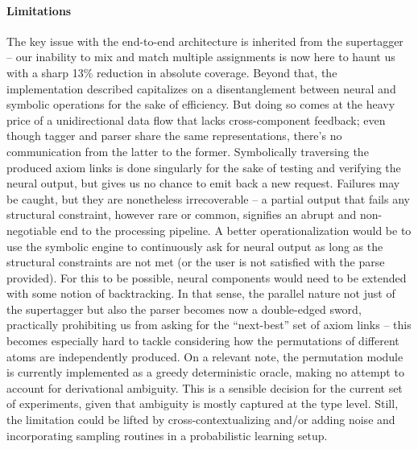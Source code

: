 \paragraph{Limitations}
The key issue with the end-to-end architecture is inherited from the supertagger -- our inability to mix and match multiple assignments is now here to haunt us with a sharp 13\% reduction in absolute coverage.
Beyond that, the implementation described capitalizes on a disentanglement between neural and symbolic operations for the sake of efficiency.
But doing so comes at the heavy price of a unidirectional data flow that lacks cross-component feedback; even though tagger and parser share the same representations, there's no communication from the latter to the former.
Symbolically traversing the produced axiom links is done singularly for the sake of testing and verifying the neural output, but gives us no chance to emit back a new request.
Failures may be caught, but they are nonetheless irrecoverable -- a partial output that fails any structural constraint, however rare or common, signifies an abrupt and non-negotiable end to the processing pipeline.
A better operationalization would be to use the symbolic engine to continuously ask for neural output as long as the structural constraints are not met (or the user is not satisfied with the parse provided).
For this to be possible, neural components would need to be extended with some notion of backtracking.
In that sense, the parallel nature not just of the supertagger but also the parser becomes now a double-edged sword, practically prohibiting us from asking for the ``next-best'' set of axiom links -- this becomes especially hard to tackle considering how the permutations of different atoms are independently produced.
On a relevant note, the permutation module is currently implemented as a greedy deterministic oracle, making no attempt to account for derivational ambiguity. 
This is a sensible decision for the current set of experiments, given that ambiguity is mostly captured at the type level.
Still, the limitation could be lifted by cross-contextualizing and/or adding noise and incorporating sampling routines in a probabilistic learning setup.

